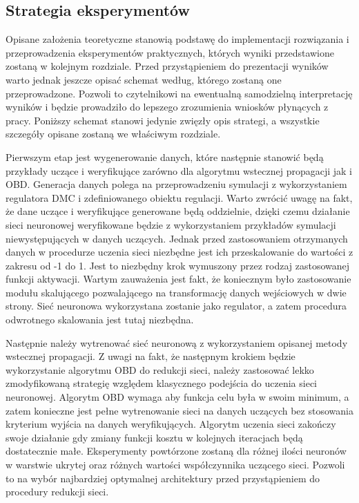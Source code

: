 \subsection{Strategia eksperymentów}
Opisane założenia teoretyczne stanowią podstawę do implementacji rozwiązania i przeprowadzenia eksperymentów praktycznych, których wyniki przedstawione zostaną w kolejnym rozdziale. Przed przystąpieniem do prezentacji wyników warto jednak jeszcze opisać schemat według, którego zostaną one przeprowadzone. Pozwoli to czytelnikowi na ewentualną samodzielną interpretację wyników i będzie prowadziło do lepszego zrozumienia wniosków płynących z pracy. Poniższy schemat stanowi jedynie zwięzły opis strategi, a wszystkie szczegóły opisane zostaną we właściwym rozdziale. 
\par Pierwszym etap jest wygenerowanie danych, które następnie stanowić będą przykłady uczące i weryfikujące zarówno dla algorytmu wstecznej propagacji jak i OBD. Generacja danych polega na przeprowadzeniu symulacji z wykorzystaniem regulatora DMC i zdefiniowanego obiektu regulacji. Warto zwrócić uwagę na fakt, że dane uczące i weryfikujące generowane będą oddzielnie, dzięki czemu działanie sieci neuronowej weryfikowane będzie z wykorzystaniem przykładów symulacji niewystępujących w danych uczących. Jednak przed zastosowaniem otrzymanych danych w procedurze uczenia sieci niezbędne jest ich przeskalowanie do wartości z zakresu od -1 do 1. Jest to niezbędny krok wymuszony przez rodzaj zastosowanej funkcji aktywacji. Wartym zauważenia jest fakt, że koniecznym było zastosowanie modułu skalującego pozwalającego na transformację danych wejściowych w dwie strony. Sieć neuronowa wykorzystana zostanie jako regulator, a zatem procedura odwrotnego skalowania jest tutaj niezbędna. 
\par Następnie należy wytrenować sieć neuronową z wykorzystaniem opisanej metody wstecznej propagacji. Z uwagi na fakt, że następnym krokiem będzie wykorzystanie algorytmu OBD do redukcji sieci, należy zastosować lekko zmodyfikowaną strategię względem klasycznego podejścia do uczenia sieci neuronowej. Algorytm OBD wymaga aby funkcja celu była w swoim minimum, a zatem konieczne jest pełne wytrenowanie sieci na danych uczących bez stosowania kryterium wyjścia na danych weryfikujących. Algorytm uczenia sieci zakończy swoje działanie gdy zmiany funkcji kosztu w kolejnych iteracjach będą dostatecznie małe. Eksperymenty powtórzone zostaną dla różnej ilości neuronów w warstwie ukrytej oraz różnych wartości współczynnika uczącego sieci. Pozwoli to na wybór najbardziej optymalnej architektury przed przystąpieniem do procedury redukcji sieci. 
